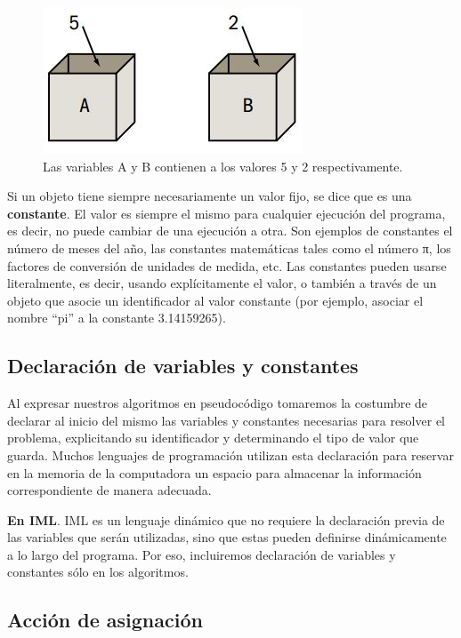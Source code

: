\documentclass[]{book}
\begin{document}
\begin{figure}

{\centering \includegraphics[width=0.5\linewidth]{images/09_cajas} 

}

\caption{Las variables A y B contienen a los valores 5 y 2 respectivamente.}\label{fig:cajas}
\end{figure}

Si un objeto tiene siempre necesariamente un valor fijo, se dice que es
una \textbf{constante}. El valor es siempre el mismo para cualquier
ejecución del programa, es decir, no puede cambiar de una ejecución a
otra. Son ejemplos de constantes el número de meses del año, las
constantes matemáticas tales como el número π, los factores de
conversión de unidades de medida, etc. Las constantes pueden usarse
literalmente, es decir, usando explícitamente el valor, o también a
través de un objeto que asocie un identificador al valor constante (por
ejemplo, asociar el nombre ``pi'' a la constante 3.14159265).

\subsection{Declaración de variables y
constantes}\label{declaracion-de-variables-y-constantes}

Al expresar nuestros algoritmos en pseudocódigo tomaremos la costumbre
de declarar al inicio del mismo las variables y constantes necesarias
para resolver el problema, explicitando su identificador y determinando
el tipo de valor que guarda. Muchos lenguajes de programación utilizan
esta declaración para reservar en la memoria de la computadora un
espacio para almacenar la información correspondiente de manera
adecuada.

\textbf{En IML}. IML es un lenguaje dinámico que no requiere la
declaración previa de las variables que serán utilizadas, sino que estas
pueden definirse dinámicamente a lo largo del programa. Por eso,
incluiremos declaración de variables y constantes sólo en los
algoritmos.

\subsection{Acción de asignación}\label{accion-de-asignacion}
\end{document}
